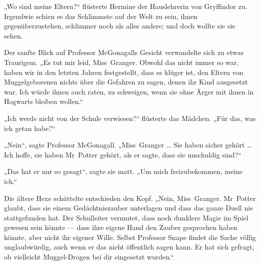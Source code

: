 „Wo sind meine Eltern?“ flüsterte Hermine der Hauslehrerin von Gryffindor zu. Irgendwie schien es das Schlimmste auf der Welt zu sein, ihnen gegenüberzustehen, schlimmer noch als alles andere; und doch wollte sie sie sehen.

Der sanfte Blick auf Professor McGonagalls Gesicht verwandelte sich zu etwas Traurigem.
„Es tut mir leid, Miss~Granger. Obwohl das nicht immer so war, haben wir in den letzten Jahren festgestellt, dass es klüger ist, den Eltern von Muggelgeborenen nichts über die Gefahren zu sagen, denen ihr Kind ausgesetzt war. Ich würde ihnen auch raten, zu schweigen, wenn sie ohne Ärger mit ihnen in Hogwarts bleiben wollen.“

„Ich werde nicht von der Schule verwiesen?“ flüsterte das Mädchen.
„Für das, was ich getan habe?“

„Nein“, sagte Professor McGonagall.
„Miss~Granger … Sie haben sicher gehört … Ich hoffe, sie haben Mr~Potter gehört, als er sagte, dass sie unschuldig sind?“

„Das hat er nur so gesagt“, sagte sie matt.
„Um mich freizubekommen, meine ich.“

Die ältere Hexe schüttelte entschieden den Kopf.
„Nein, Miss~Granger. Mr~Potter glaubt, dass sie einem Gedächtniszauber unterlagen und dass das ganze Duell nie stattgefunden hat. Der Schulleiter vermutet, dass noch dunklere Magie im Spiel gewesen sein könnte — dass ihre eigene Hand den Zauber gesprochen haben könnte, aber nicht ihr eigener Wille. Selbst Professor Snape findet die Sache völlig unglaubwürdig, auch wenn er das nicht öffentlich sagen kann. Er hat sich gefragt, ob vielleicht Muggel-Drogen bei dir eingesetzt wurden.“

